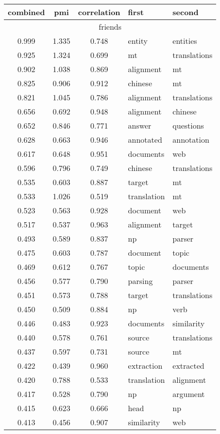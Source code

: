 \begin{tabular}{cccp{5cm}p{5cm}}
\toprule
combined & pmi & correlation & first & second\\
\midrule
\multicolumn{5}{c}{friends}\\
0.999 & 1.335 & 0.748 & entity & entities \\
0.925 & 1.324 & 0.699 & mt & translations \\
0.902 & 1.038 & 0.869 & alignment & mt \\
0.825 & 0.906 & 0.912 & chinese & mt \\
0.821 & 1.045 & 0.786 & alignment & translations \\
0.656 & 0.692 & 0.948 & alignment & chinese \\
0.652 & 0.846 & 0.771 & answer & questions \\
0.628 & 0.663 & 0.946 & annotated & annotation \\
0.617 & 0.648 & 0.951 & documents & web \\
0.596 & 0.796 & 0.749 & chinese & translations \\
0.535 & 0.603 & 0.887 & target & mt \\
0.533 & 1.026 & 0.519 & translation & mt \\
0.523 & 0.563 & 0.928 & document & web \\
0.517 & 0.537 & 0.963 & alignment & target \\
0.493 & 0.589 & 0.837 & np & parser \\
0.475 & 0.603 & 0.787 & document & topic \\
0.469 & 0.612 & 0.767 & topic & documents \\
0.456 & 0.577 & 0.790 & parsing & parser \\
0.451 & 0.573 & 0.788 & target & translations \\
0.450 & 0.509 & 0.884 & np & verb \\
0.446 & 0.483 & 0.923 & documents & similarity \\
0.440 & 0.578 & 0.761 & source & translations \\
0.437 & 0.597 & 0.731 & source & mt \\
0.422 & 0.439 & 0.960 & extraction & extracted \\
0.420 & 0.788 & 0.533 & translation & alignment \\
0.417 & 0.528 & 0.790 & np & argument \\
0.415 & 0.623 & 0.666 & head & np \\
0.413 & 0.456 & 0.907 & similarity & web \\

\end{tabular}

